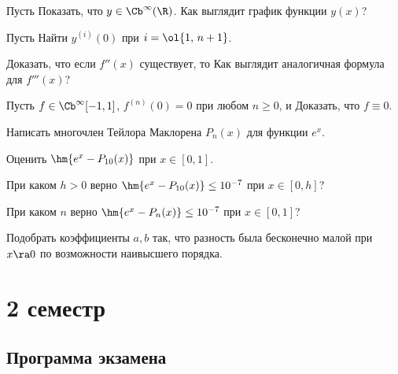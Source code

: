 \documentclass[a4paper]{article}
\begin{document}
\begin{problem}
Пусть
Показать, что $y \in \Cb^\infty(\R)$. Как выглядит график функции $y(x)$?
\end{problem}

\begin{problem}
Пусть
Найти $y^{(i)}(0)$ при $i=\ol{1,\, n+1}$.
\end{problem}

\begin{problem}
Доказать, что если $f''(x)$ существует, то
Как выглядит аналогичная формула для $f'''(x)$?
\end{problem}

\begin{problem}
Пусть $f \in\Cb^\infty[-1,1]$, $f^{(n)}(0)=0$ при любом $n \ge 0$, и
Доказать, что $f \equiv 0$.
\end{problem}

\begin{problem}
Написать многочлен Тейлора Маклорена $P_n(x)$ для функции $e^x$.

 Оценить $\hm{e^x - P_{10}(x)}$ при $x \in[0,1]$.

 При каком $h > 0$ верно $\hm{e^x - P_{10}(x)} \le 10^{-7}$ при $x \in [0,h]$?

 При каком $n$ верно $\hm{e^x - P_n(x)} \le 10^{-7}$ при $x \in [0,1]$?
\end{problem}

\begin{problem}
Подобрать коэффициенты $a,b $ так, что разность
была бесконечно малой при $x \ra 0$ по возможности наивысшего порядка.
\end{problem}

\pagebreak

\section{2 семестр}

\subsection{Программа экзамена}
\end{document}
